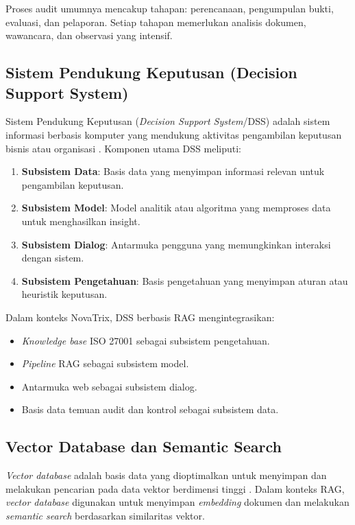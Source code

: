 \documentclass[bachelor,bahasa]{thesisdtetiugm}
\begin{document}
Proses audit umumnya mencakup tahapan: perencanaan, pengumpulan bukti, evaluasi, dan pelaporan. Setiap tahapan memerlukan analisis dokumen, wawancara, dan observasi yang intensif.

\subsection{Sistem Pendukung Keputusan (Decision Support System)}

Sistem Pendukung Keputusan (\textit{Decision Support System}/DSS) adalah sistem informasi berbasis komputer yang mendukung aktivitas pengambilan keputusan bisnis atau organisasi \cite{dsstheory}. Komponen utama DSS meliputi:

\begin{enumerate}
	\item \textbf{Subsistem Data}: Basis data yang menyimpan informasi relevan untuk pengambilan keputusan.
	\item \textbf{Subsistem Model}: Model analitik atau algoritma yang memproses data untuk menghasilkan insight.
	\item \textbf{Subsistem Dialog}: Antarmuka pengguna yang memungkinkan interaksi dengan sistem.
	\item \textbf{Subsistem Pengetahuan}: Basis pengetahuan yang menyimpan aturan atau heuristik keputusan.
\end{enumerate}

Dalam konteks NovaTrix, DSS berbasis RAG mengintegrasikan:
\begin{itemize}
	\item \textit{Knowledge base} ISO 27001 sebagai subsistem pengetahuan.
	\item \textit{Pipeline} RAG sebagai subsistem model.
	\item Antarmuka web sebagai subsistem dialog.
	\item Basis data temuan audit dan kontrol sebagai subsistem data.
\end{itemize}

\subsection{Vector Database dan Semantic Search}

\textit{Vector database} adalah basis data yang dioptimalkan untuk menyimpan dan melakukan pencarian pada data vektor berdimensi tinggi \cite{vectordbsurvey}. Dalam konteks RAG, \textit{vector database} digunakan untuk menyimpan \textit{embedding} dokumen dan melakukan \textit{semantic search} berdasarkan similaritas vektor.
\end{document}
